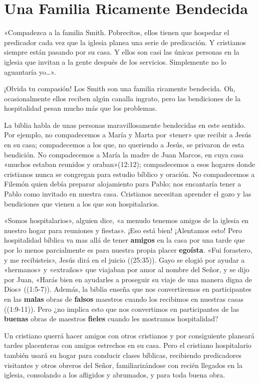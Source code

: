 \documentclass[12pt, twoside, openright]{book}
\begin{document}
\section{Una Familia Ricamente Bendecida}
«Compadezca a la familia Smith. Pobrecitos, ellos tienen que hospedar el predicador cada vez que la iglesia planea una serie de predicación. Y cristianos siempre están pasando por su casa. Y ellos son casi las únicas personas en la iglesia que invitan a la gente después de los servicios. Simplemente no lo aguantaría yo…».

¡Olvida tu compasión! Los Smith son una familia ricamente bendecida. Oh, ocasionalmente ellos reciben algún canalla ingrato, pero las bendiciones de la hospitalidad pesan mucho más que los problemas.

La biblia habla de unas personas maravillosamente bendecidas en este sentido. Por ejemplo, no compadecemos a María y Marta por «tener» que recibir a Jesús en su casa; compadecemos a los que, no queriendo a Jesús, se privaron de esta bendición. No compadecemos a María la madre de Juan Marcos, en cuya casa «muchos estaban reunidos y oraban»(12:12); compadecemos a esos hogares donde cristianos nunca se congregan para estudio bíblico y oración. No compadecemos a Filemón quien debía preparar alojamiento para Pablo; nos encantaría tener a Pablo como invitado en nuestra casa. Cristianos necesitan aprender el gozo y las bendiciones que vienen a los que son hospitalarios.

«Somos hospitalarios», alguien dice, «a menudo tenemos amigos de la iglesia en nuestro hogar para reuniones y fiestas». ¡Eso está bien! ¡Alentamos esto! Pero hospitalidad bíblica va mas allá de tener \textbf{amigos} en la casa por una tarde que por lo menos parcialmente es para nuestra propia placer \textbf{egoísta}. «Fui forastero, y me recibisteis», Jesús dirá en el juicio ((25:35)). Gayo se elogió por ayudar a «hermanos» y  «extraños» que viajaban por amor al nombre del Señor, y se dijo por Juan, «Harás bien en ayudarles a proseguir su viaje de una manera digna de Dios» ((1:5-7)). Además, la biblia enseña que nos convertiremos en participantes en las \textbf{malas} obras de \textbf{falsos} maestros cuando los recibimos en nuestras casas ((1:9-11)). Pero ¿no implica esto que nos convertimos en participantes de las \textbf{buenas} obras de maestros \textbf{fieles} cuando les mostramos hospitalidad?

Un cristiano querrá hacer amigos con otros cristianos y por consiguiente planeará tardes placenteras con amigos estrechos en su casa. Pero el cristiano hospitalario también usará su hogar para conducir clases bíblicas, recibiendo predicadores visitantes y otros obreros del Señor, familiarizándose con recién llegados en la iglesia, consolando a los afligidos y abrumados, y para toda buena obra.
\end{document}
